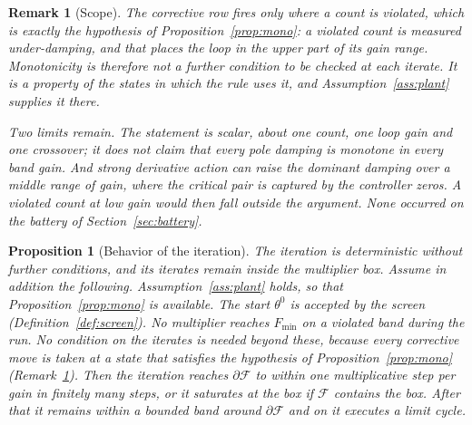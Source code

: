 \documentclass[final,3p,times,twocolumn]{elsarticle}
\newcommand{\rev}[1]{#1}   %
\newcommand{\fix}[1]{#1}  %
\newtheorem{proposition}{Proposition}
\newtheorem{remark}{Remark}
\begin{document}
\begin{remark}[Scope]\label{rem:scope}
The corrective row fires only where a count is violated, which is
exactly the hypothesis of Proposition~\ref{prop:mono}: a violated count
is measured under-damping, and that places the loop in the upper part of
its gain range. Monotonicity is therefore not a further condition to be
checked at each iterate. It is a property of the states in which the rule
uses it, and Assumption~\ref{ass:plant} supplies it there.

Two limits remain. The statement is scalar, about one count, one loop
gain and one crossover; it does not claim that every pole damping is
monotone in every band gain. And strong derivative action can raise the
dominant damping over a middle range of gain, where the critical pair is
captured by the controller zeros. A violated count at low gain would
then fall outside the argument. None occurred on the battery of
Section~\ref{sec:battery}.
\end{remark}

\begin{proposition}[Behavior of the iteration]\label{prop:conv}
The iteration is deterministic without further conditions, and its
iterates remain inside the multiplier box. Assume in addition the
following. Assumption~\ref{ass:plant} holds, so that
Proposition~\ref{prop:mono} is available. The start $\theta^0$ is
accepted by the screen (Definition~\ref{def:screen}). No multiplier
reaches $F_{\min}$ on a violated band during the run. \rev{No condition
on the iterates is needed beyond these, because every corrective move is
taken at a state that satisfies the hypothesis of
Proposition~\ref{prop:mono} (Remark~\ref{rem:scope}).} Then the iteration reaches
\fix{$\partial\mathcal F$ to within one multiplicative step per gain} in
finitely many steps, or it saturates at the box if $\mathcal F$ contains
the box. After that it remains within a \fix{bounded} band around
$\partial\mathcal F$ and \fix{on it} executes a limit cycle.
\end{proposition}
\end{document}
